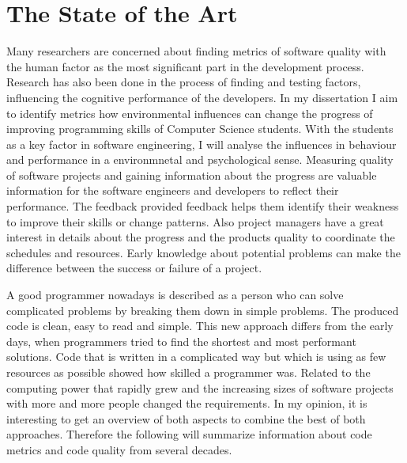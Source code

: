 \chapter{The State of the Art}

Many researchers are concerned about finding metrics of software quality with the human factor as the most significant part in the development process. 
Research has also been done in the process of finding and testing factors, influencing the  cognitive performance of the developers.
In my dissertation I aim to identify metrics how environmental influences can change the progress of improving programming skills of Computer Science students.
With the students as a key factor in software engineering, I will analyse the influences in behaviour and performance in a environmnetal and psychological sense. 
\cite{denissen2008effects}
Measuring quality of software projects and gaining information about the progress are valuable information for the software engineers and developers to reflect their performance. The feedback provided feedback helps them identify their weakness to improve their skills or change patterns. 
\cite{johnson1999leap}
\cite{Martin:2008:CCH:1388398}
Also project managers have a great interest in details about the progress and the products quality to coordinate the schedules and resources. 
Early knowledge about potential problems can make the difference between the success or failure of a project.

A good programmer nowadays is described as a person who can solve complicated problems by breaking them down in simple problems. The produced code is clean, easy to read and simple. \cite{johnson1999leap}
This new approach differs from the early days, when programmers tried to find the shortest and most performant solutions. Code that is written in a complicated way but which is using as few resources as possible showed how skilled a programmer was. 
Related to the computing power that rapidly grew and the increasing sizes of software projects with more and more people changed the requirements. 
In my opinion, it is interesting to get an overview of both aspects to combine the best of both approaches. Therefore the following will summarize information about code metrics and code quality from several decades.


